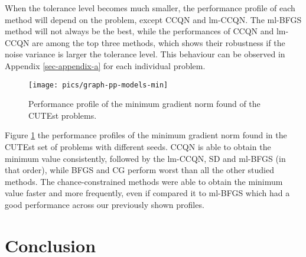 \documentclass[11pt,twoside]{article}
\def\AFcomment#1{{\color{red}\emph{AF: #1}}}
\def\GCcomment#1{{\color{red}\emph{GC: #1}}}
\begin{document}
When the tolerance level becomes much smaller, the performance profile of each method will depend on the problem, except CCQN and lm-CCQN. The ml-BFGS method will not always be the best, while the performances of CCQN and lm-CCQN are among the top three methods, which shows their robustness if the noise variance is larger the tolerance level. This behaviour can be observed in Appendix \ref{sec-appendix-a} for each individual problem.


\begin{figure}[H]
                \centering
                \texttt{[image: pics/graph-pp-models-min]}
                \caption{Performance profile of the minimum gradient norm found of the CUTEst problems.}
                \label{graph:models-cutemin}
\end{figure}

Figure \ref{graph:models-cutemin} the performance profiles of the minimum gradient norm found in the CUTEst set of problems with different seeds. CCQN is able to obtain the minimum value consistently, followed by the
lm-CCQN, SD and ml-BFGS (in that order), while BFGS and CG perform worst than all the other studied methods. The chance-constrained methods were able to obtain the minimum value faster and more frequently, even if compared it to ml-BFGS which had a good performance across our previously shown profiles.

\section{Conclusion}

\iffalse
\AFcomment{The chance constrained model is an add-on, it is not the
  only thing we investigate. Low-rank quasi-Newton methods is our focus.}
\fi

\iffalse
In the present paper, our objective was to propose a new method of
finding adequate candidates for descent direction in a noisy
framework. While this topic has been explored before, we approached
the problem by assuming the gradient is influenced by noise modelled
as a random variable. Following this idea, based on a quasi-Newton
approach, we have formulated a chance constrained stochastic
optimization model for computing high-accuracy solutions by finding a
search direction with best quality according to some quality measures,
such that the probability of the direction being a quasi-Newton
direction is guaranteed.
\fi
\end{document}

